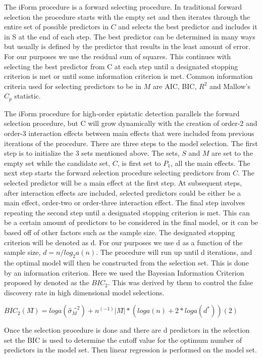 \documentclass[]{book}
\theoremstyle{definition}
\theoremstyle{definition}
\theoremstyle{remark}
\begin{document}
The iForm procedure is a forward selecting procedure. In traditional
forward selection the procedure starts with the empty set and then
iterates through the entire set of possible predictors in \(C\) and
selects the best predictor and includes it in S at the end of each step.
The best predictor can be determined in many ways but usually is defined
by the predictor that results in the least amount of error. For our
purposes we use the residual sum of squares. This continues with
selecting the best predictor from C at each step until a designated
stopping criterion is met or until some information criterion is met.
Common information criteria used for selecting predictors to be in \(M\)
are AIC, BIC, \(R^2\) and Mallow's \(C_p\) statistic.

The iForm procedure for high-order epistatic detection parallels the
forward selection procedure, but C will grow dynamically with the
creation of order-2 and order-3 interaction effects between main effects
that were included from previous iterations of the procedure. There are
three steps to the model selection. The first step is to initialize the
3 sets mentioned above. The sets, \(S\) and \(M\) are set to the empty
set while the candidate set, \(C\), is first set to \(P_1\), all the
main effects. The next step starts the forward selection procedure
selecting predictors from \(C\). The selected predictor will be a main
effect at the first step. At subsequent steps, after interaction effects
are included, selected predictors could be either be a main effect,
order-two or order-three interaction effect. The final step involves
repeating the second step until a designated stopping criterion is met.
This can be a certain amount of predictors to be considered in the final
model, or it can be based off of other factors such as the sample size.
The designated stopping criterion will be denoted as d. For our purposes
we use d as a function of the sample size, \(d = n/lo g_2a(n)\). The
procedure will run up until d iterations, and the optimal model will
then be constructed from the selection set. This is done by an
information criterion. Here we used the Bayesian Information Criterion
proposed by \cite{chen2008extended} denoted as the \(BIC_2\). This was
derived by them to control the false discovery rate in high dimensional
model selections.

\(BIC_2 (M ̂ )=loga(σ ̂_M ̂^2 )+n^(-1) |M ̂ |*(loga(n)+2*loga(d^* ) ) (2)\)

Once the selection procedure is done and there are d predictors in the
selection set the BIC is used to determine the cutoff value for the
optimum number of predictors in the model set. Then linear regression is
performed on the model set.
\end{document}
